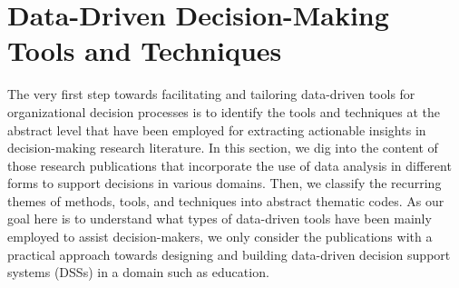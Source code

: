 \documentclass{sfuthesis}
\begin{document}
\section{Data-Driven Decision-Making Tools and Techniques}
The very first step towards facilitating and tailoring data-driven tools for organizational decision processes is to identify the tools and techniques at the abstract level that have been employed for extracting actionable insights in decision-making research literature. In this section, we dig into the content of those research publications that incorporate the use of data analysis in different forms to support decisions in various domains. Then, we classify the recurring themes of methods, tools, and techniques into abstract thematic codes. As our goal here is to understand what types of data-driven tools have been mainly employed to assist decision-makers, we only consider the publications with a practical approach towards designing and building data-driven decision support systems (DSSs) in a domain such as education.
\end{document}
